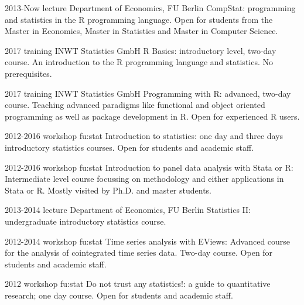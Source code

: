 \documentclass[]{friggeri-cv} %
\begin{document}
\begin{entrylist}


\entry
{2013-Now}
{lecture}
{Department of Economics, FU Berlin}
{CompStat: programming and statistics in the R programming language. Open for students from the Master in Economics, Master in Statistics and Master in Computer Science.}


\entry
{2017}
{training}
{INWT Statistics GmbH}
{R Basics: introductory level, two-day course. An introduction to the R programming language and statistics. No prerequisites.}


\entry
{2017}
{training}
{INWT Statistics GmbH}
{Programming with R: advanced, two-day course. Teaching advanced paradigms like functional and object oriented programming as well as package development in R. Open for experienced R users.}

\end{entrylist}
\begin{entrylist}


\entry
{2012-2016}
{workshop}
{fu:stat}
{Introduction to statistics: one day and three days introductory statistics courses. Open for students and academic staff.}


\entry
{2012-2016}
{workshop}
{fu:stat}
{Introduction to panel data analysis with Stata or R: Intermediate level course focussing on methodology and either applications in Stata or R. Mostly visited by Ph.D. and master students.}


\entry
{2013-2014}
{lecture}
{Department of Economics, FU Berlin}
{Statistics II: undergraduate introductory statistics course.}


\entry
{2012-2014}
{workshop}
{fu:stat}
{Time series analysis with EViews: Advanced course for the analysis of cointegrated time series data. Two-day course. Open for students and academic staff.}


\entry
{2012}
{workshop}
{fu:stat}
{Do not trust any statistics!: a guide to quantitative research; one day course. Open for students and academic staff.}

%
\end{entrylist}
\end{document}
